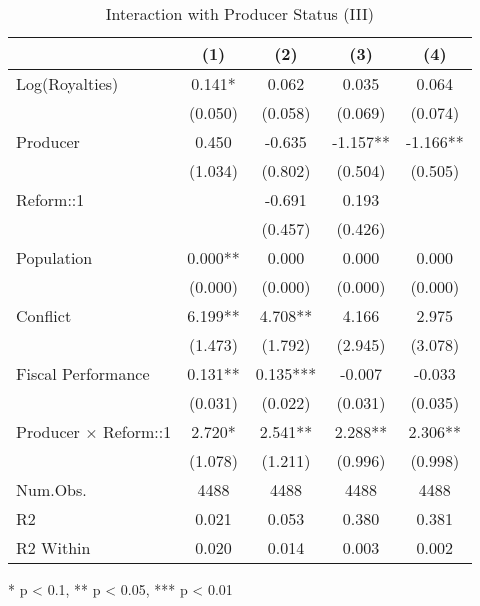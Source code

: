 \begin{table}[t]
\caption*{
{\large Interaction with Producer Status (III)}
} 
\fontsize{12.0pt}{14.4pt}\selectfont
\begin{tabular*}{\linewidth}{@{\extracolsep{\fill}}lcccc}
\toprule
  & (1) & (2) & (3) & (4) \\ 
\midrule\addlinespace[2.5pt]
Log(Royalties) & 0.141* & 0.062 & 0.035 & 0.064 \\ 
 & (0.050) & (0.058) & (0.069) & (0.074) \\ 
Producer & 0.450 & -0.635 & -1.157** & -1.166** \\ 
 & (1.034) & (0.802) & (0.504) & (0.505) \\ 
Reform::1 &  & -0.691 & 0.193 &  \\ 
 &  & (0.457) & (0.426) &  \\ 
Population & 0.000** & 0.000 & 0.000 & 0.000 \\ 
 & (0.000) & (0.000) & (0.000) & (0.000) \\ 
Conflict & 6.199** & 4.708** & 4.166 & 2.975 \\ 
 & (1.473) & (1.792) & (2.945) & (3.078) \\ 
Fiscal Performance & 0.131** & 0.135*** & -0.007 & -0.033 \\ 
 & (0.031) & (0.022) & (0.031) & (0.035) \\ 
Producer × Reform::1 & 2.720* & 2.541** & 2.288** & 2.306** \\ 
{} & {(1.078)} & {(1.211)} & {(0.996)} & {(0.998)} \\ 
Num.Obs. & 4488 & 4488 & 4488 & 4488 \\ 
R2 & 0.021 & 0.053 & 0.380 & 0.381 \\ 
R2 Within & 0.020 & 0.014 & 0.003 & 0.002 \\ 
\bottomrule
\end{tabular*}
\begin{minipage}{\linewidth}
* p < 0.1, ** p < 0.05, *** p < 0.01\\
\end{minipage}
\end{table}

